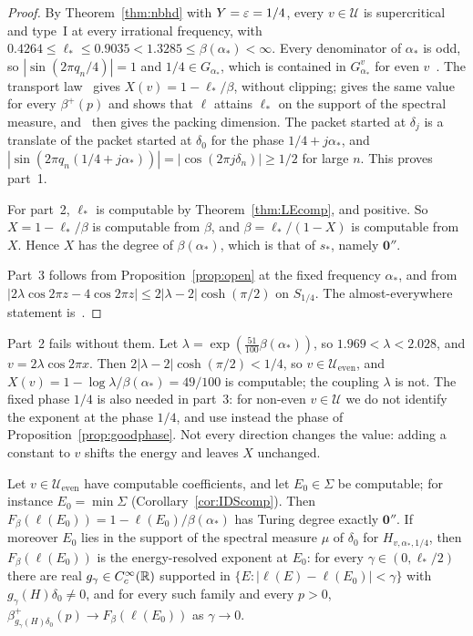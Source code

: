 \begin{proof}
By Theorem~\ref{thm:nbhd} with $Y=\varepsilon=1/4$, every $v\in\mathcal U$ is supercritical and type~I at every irrational frequency, with $0.4264\le\ell_*\le0.9035<1.3285\le\beta(\alpha_*)<\infty$. Every denominator of $\alpha_*$ is odd, so $|\sin(2\pi q_n/4)|=1$ and $1/4\in G_{\alpha_*}$, which is contained in $G^v_{\alpha_*}$ for even $v$~\cite[Lemma~5.22]{DMuniv}. The transport law~\cite[Theorem~A]{DMuniv} gives $X(v)=1-\ell_*/\beta$, without clipping; \cite[Theorem~B(1)]{DMuniv} gives the same value for every $\beta^+(p)$ and shows that $\ell$ attains $\ell_*$ on the support of the spectral measure, and~\cite[Theorem~B(3)]{DMuniv} then gives the packing dimension. The packet started at $\delta_j$ is a translate of the packet started at $\delta_0$ for the phase $1/4+j\alpha_*$, and $|\sin(2\pi q_n(1/4+j\alpha_*))|=|\cos(2\pi j\delta_n)|\ge1/2$ for large $n$. This proves part~1.

For part~2, $\ell_*$ is computable by Theorem~\ref{thm:LEcomp}, and positive. So $X=1-\ell_*/\beta$ is computable from $\beta$, and $\beta=\ell_*/(1-X)$ is computable from $X$. Hence $X$ has the degree of $\beta(\alpha_*)$, which is that of $s_*$, namely $\mathbf 0''$.

Part~3 follows from Proposition~\ref{prop:open} at the fixed frequency $\alpha_*$, and from $|2\lambda\cos2\pi z-4\cos2\pi z|\le2|\lambda-2|\cosh(\pi/2)$ on $S_{1/4}$. The almost-everywhere statement is~\cite[Theorem~A]{DMuniv}.
\end{proof}

\begin{remark}\label{rem:noncomp}
Part~2 fails without them. Let $\lambda=\exp(\frac{51}{100}\beta(\alpha_*))$, so $1.969<\lambda<2.028$, and $v=2\lambda\cos2\pi x$. Then $2|\lambda-2|\cosh(\pi/2)<1/4$, so $v\in\mathcal U_{\mathrm{even}}$, and $X(v)=1-\log\lambda/\beta(\alpha_*)=49/100$ is computable; the coupling $\lambda$ is not. The fixed phase $1/4$ is also needed in part~3: for non-even $v\in\mathcal U$ we do not identify the exponent at the phase $1/4$, and use instead the phase of Proposition~\ref{prop:goodphase}. Not every direction changes the value: adding a constant to $v$ shifts the energy and leaves $X$ unchanged.
\end{remark}

\begin{theorem}\label{thm:energyres}
Let $v\in\mathcal U_{\mathrm{even}}$ have computable coefficients, and let $E_0\in\Sigma$ be computable; for instance $E_0=\min\Sigma$ (Corollary~\ref{cor:IDScomp}). Then $F_\beta(\ell(E_0))=1-\ell(E_0)/\beta(\alpha_*)$ has Turing degree exactly $\mathbf 0''$. If moreover $E_0$ lies in the support of the spectral measure $\mu$ of $\delta_0$ for $H_{v,\alpha_*,1/4}$, then $F_\beta(\ell(E_0))$ is the energy-resolved exponent at $E_0$: for every $\gamma\in(0,\ell_*/2)$ there are real $g_\gamma\in C_c^\infty(\mathbb R)$ supported in $\{E:|\ell(E)-\ell(E_0)|<\gamma\}$ with $g_\gamma(H)\delta_0\ne0$, and for every such family and every $p>0$, $\beta^+_{g_\gamma(H)\delta_0}(p)\to F_\beta(\ell(E_0))$ as $\gamma\to0$.
\end{theorem}

